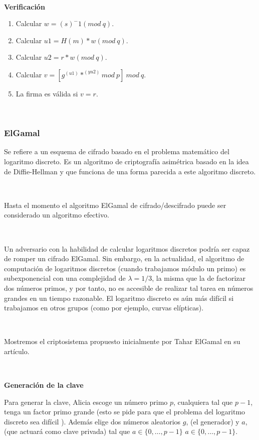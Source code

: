\documentclass[11pt, conference]{IEEEtran}
\begin{document}
\

\textbf{Verificación}

\begin{enumerate}
\item Calcular $w = (s)^-1(mod\ q)$.
\item Calcular $u1 = H(m)*w(mod\ q)$.
\item Calcular $u2 = r*w(mod\ q)$.
\item Calcular $v = [g^(u1)*^(yu2)mod\ p]\ mod\ q$.
\item La firma es válida si $v = r$.
\end{enumerate}

\

\subsubsection{ElGamal}
Se refiere a un esquema de cifrado basado en el problema matemático del logaritmo discreto. Es un algoritmo de criptografía asimétrica basado en la idea de Diffie-Hellman y que funciona de una forma parecida a este algoritmo discreto.

\

Hasta el momento el algoritmo ElGamal de cifrado/descifrado puede ser considerado un algoritmo efectivo.

\

Un adversario con la habilidad de calcular logaritmos discretos podría ser capaz de romper un cifrado ElGamal. Sin embargo, en la actualidad, el algoritmo de computación de logaritmos discretos (cuando trabajamos módulo un primo) es subexponencial con una complejidad de $\lambda = 1/3$, la misma que la de factorizar dos números primos, y por tanto, no es accesible de realizar tal tarea en números grandes en un tiempo razonable. El logaritmo discreto es aún más difícil si trabajamos en otros grupos (como por ejemplo, curvas elípticas).

\

Mostremos el criptosistema propuesto inicialmente por Tahar ElGamal en su artículo.

\

\textbf{Generación de la clave}

Para generar la clave, Alicia escoge un número primo $p$, cualquiera tal que $p-1$, tenga un factor primo grande (esto se pide para que el problema del logaritmo discreto sea difícil ). Además elige dos números aleatorios $g$, (el generador) y $a$, (que actuará como clave privada) tal que $a\in \{0,\ldots ,p-1\}$ $a\in \{0,\ldots ,p-1\}$.
\end{document}

